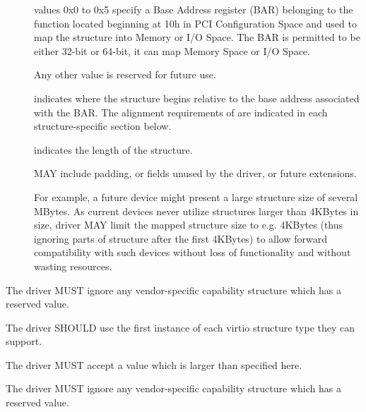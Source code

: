 \begin{description}
\item[]
        values 0x0 to 0x5 specify a Base Address register (BAR) belonging to
        the function located beginning at 10h in PCI Configuration Space
        and used to map the structure into Memory or I/O Space.
        The BAR is permitted to be either 32-bit or 64-bit, it can map Memory Space
        or I/O Space.

        Any other value is reserved for future use.

\item[]
        indicates where the structure begins relative to the base address associated
        with the BAR.  The alignment requirements of  are indicated
        in each structure-specific section below.

\item[]
        indicates the length of the structure.

         MAY include padding, or fields unused by the driver, or
        future extensions.

        \begin{note}
        For example, a future device might present a large structure size of several
        MBytes.
        As current devices never utilize structures larger than 4KBytes in size,
        driver MAY limit the mapped structure size to e.g.
        4KBytes (thus ignoring parts of structure after the first
        4KBytes) to allow forward compatibility with such devices without loss of
        functionality and without wasting resources.
        \end{note}
\end{description}


The driver MUST ignore any vendor-specific capability structure which has
a reserved  value.

The driver SHOULD use the first instance of each virtio structure type they can
support.

The driver MUST accept a  value which is larger than specified here.

The driver MUST ignore any vendor-specific capability structure which has
a reserved  value.

